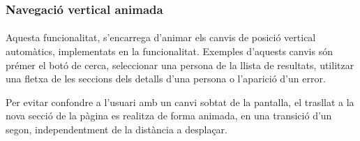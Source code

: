 \subsubsection{Navegació vertical animada}

\paragraph{}
Aquesta funcionalitat, s’encarrega d’animar els canvis de posició vertical automàtics, implementats en la funcionalitat. Exemples d’aquests canvis són prémer el botó de cerca, seleccionar una persona de la llista de resultats, utilitzar una fletxa de les seccions dels detalls d'una persona o l'aparició d'un error.

Per evitar confondre a l'usuari amb un canvi sobtat de la pantalla, el trasllat a la nova secció de la pàgina es realitza de forma animada, en una transició d'un segon, independentment de la distància a desplaçar.
